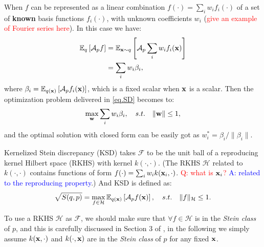 \documentclass{article}
\begin{document}
When $f$ can be represented as a linear combination $f(\cdot) = \sum_i w_i f_i(\cdot)$  of a set of \textbf{known} basis functions $f_i(\cdot)$, with unknown coefficients $w_i$ (\textcolor{red}{give an example of Fourier series here}). In this case we have:
\begin{equation}
    \begin{aligned}
        \mathbb{E}_q\left[ \mathcal{A}_p f \right] &= \mathbb{E}_{{\mathbf{x}} \sim q}\left[ \mathcal{A}_p \sum_i w_i f_i({\mathbf{x}}) \right] \\
        &= \sum_i w_i \beta_i,
    \end{aligned}
\end{equation}
where $\beta_i = \mathbb{E}_{q({\mathbf{x}})}\left[ \mathcal{A}_p f_i({\mathbf{x}}) \right]$, which is a fixed scalar when ${\mathbf{x}}$ is a scalar. Then the optimization problem delivered in \eqref{eq.SD} becomes to:
\begin{equation}\label{eq.SDoptimization}
    \max_{{\mathbf{w}}} \sum_{i} w_i\beta_i, \quad s.t. \quad \|{\mathbf{w}}\| \leq 1,
\end{equation}
and the optimal solution with closed form can be easily got as $w^*_i = \beta_i / \| \beta_i \|$. 

Kernelized Stein discrepancy (KSD) takes $\mathcal{F}$ to be the unit ball of a reproducing kernel Hilbert space (RKHS) with kernel $k(\cdot, \cdot)$. (The RKHS $\mathcal{H}$ related to $k(\cdot, \cdot)$ contains functions of form $f(\cdot) = \sum_i w_i k({{\mathbf{x}}_i}, \cdot)$. \textcolor{red}{Q: what is ${\mathbf{x}}_i$?} \textcolor{blue}{A: related to the reproducing property}.) And KSD is defined as:
\begin{equation}\label{eq.KSD}
    \sqrt{S(q, p)} = \max_{f \in \mathcal{H}}\mathbb{E}_{q({\mathbf{x}})}\left[\mathcal{A}_p f({\mathbf{x}})\right], \quad s.t. \quad \|f\|_{\mathcal{H}} \leq 1.
\end{equation}

To use a RKHS $\mathcal{H}$ as $\mathcal{F}$, we should make sure that $\forall f \in \mathcal{H}$ is in the \textit{Stein class} of $p$, and this is carefully discussed in Section 3 of \citep{liu2016kernelized}, in the following we simply assume $k({\mathbf{x}}, \cdot)$ and $k(\cdot, {\mathbf{x}})$ are in the \textit{Stein class} of $p$ for any fixed ${\mathbf{x}}$.
\end{document}
